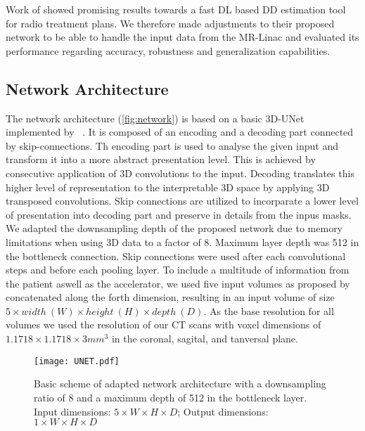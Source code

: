 Work of \citeauthor{kontaxis_deepdose_2020} showed promising results towards a fast \acs{DL} based \acs{DD} estimation tool for radio treatment plans.
We therefore made adjustments to their proposed network to be able to handle the input data from the MR-Linac and evaluated its performance regarding accuracy, robustness and generalization capabilities. 

\subsection{Network Architecture}

The network architecture (\autoref{fig:network}) is based on a basic 3D-UNet implemented by \citeauthor{ronneberger_u-net_2015-1}~\cite{ronneberger_u-net_2015-1}.
It is composed of an encoding and a decoding part connected by skip-connections.
Th encoding part is used to analyse the given input and transform it into a more abstract presentation level. 
This is achieved by consecutive application of 3D convolutions to the input.
Decoding translates this higher level of representation to the interpretable 3D space by applying 3D transposed convolutions.
Skip connections are utilized to incorparate a lower level of presentation into decoding part and preserve in details from the inpus masks.\\
We adapted the downsampling depth of the proposed network due to memory limitations when using 3D data to a factor of 8. 
Maximum layer depth was 512 in the bottleneck connection. 
Skip connections were used after each convolutional steps and before each pooling layer. 
To include a multitude of information from the patient aswell as the accelerator, we used five input volumes as proposed by \cite{kontaxis_deepdose_2020} concatenated along the forth dimension, resulting in an input volume of size $5 \times width \ (W) \times height \ (H) \times depth \ (D)$.
As the base resolution for all volumes we used the resolution of our CT scans with voxel dimensions of $1.1718 \times 1.1718 \times 3 mm^3$ in the coronal, sagital, and tanversal plane. 


\begin{figure}
    \centering
    \texttt{[image: UNET.pdf]}
    \caption{Basic scheme of adapted network architecture with a downsampling ratio of 8 and a maximum depth of 512 in the bottleneck layer. Input dimensions: $5 \times W \times H \times D$; Output dimensions: $1 \times W \times H \times D$}\label{fig:network}
\end{figure}

